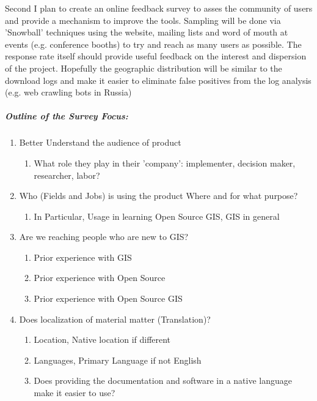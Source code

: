 \documentclass[12pt,letterpaper]{article}
\begin{document}
 
Second I plan to create an online feedback survey to asses the community of users and provide a mechanism to improve the tools. Sampling will be done via 'Snowball' techniques using the  website, mailing lists and word of mouth at events (e.g. conference booths) to try and reach as many users as possible. The response rate itself should provide useful feedback on the interest and dispersion of the project. Hopefully the geographic distribution will be similar to the download logs and make it easier to eliminate false positives from the log analysis (e.g. web crawling bots in Russia)

\subparagraph{Outline of the Survey Focus:}
\begin{enumerate}
\item Better Understand the audience of product
	\begin{enumerate}
		\item What role they play in their 'company': implementer, decision maker, researcher, labor?
	\end{enumerate}
\item Who (Fields and Jobs) is using the product Where and for what purpose?
	\begin{enumerate}
		\item In Particular, Usage in learning Open Source GIS, GIS in general
	\end{enumerate}
\item Are we reaching people who are new to GIS?
	\begin{enumerate}
		\item Prior experience with GIS
		\item Prior experience with Open Source
		\item Prior experience with Open Source GIS
	\end{enumerate}
\item Does localization of material matter (Translation)?	
	\begin{enumerate}
		\item Location, Native location if different
		\item Languages, Primary Language if not English
		\item Does providing the documentation and software in a native language make it easier to use?
	\end{enumerate}
\end{enumerate}
		
\end{document}
